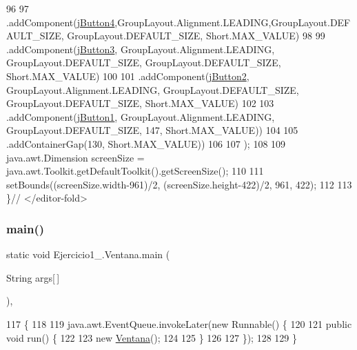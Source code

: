 \begin{DoxyCode}
96 
97                    .addComponent(\mbox{\hyperlink{class_ejercicio1__3_1_1_ventana_a06b0fc7e1c5922e1e6804014d6e3c061}{jButton4}},GroupLayout.Alignment.LEADING,GroupLayout.DEFAULT\_SIZE, 
      GroupLayout.DEFAULT\_SIZE, Short.MAX\_VALUE)
98 
99                    .addComponent(\mbox{\hyperlink{class_ejercicio1__3_1_1_ventana_a41e3718d7909beec7776b977e931a53e}{jButton3}}, GroupLayout.Alignment.LEADING, GroupLayout.DEFAULT\_SIZE,
       GroupLayout.DEFAULT\_SIZE, Short.MAX\_VALUE)
100 
101                    .addComponent(\mbox{\hyperlink{class_ejercicio1__3_1_1_ventana_a53161bde48e247e8ea1ea2bc6474ec97}{jButton2}}, GroupLayout.Alignment.LEADING, GroupLayout.DEFAULT\_SIZE,
       GroupLayout.DEFAULT\_SIZE, Short.MAX\_VALUE)
102 
103                    .addComponent(\mbox{\hyperlink{class_ejercicio1__3_1_1_ventana_a9c2a8cc20df43585485cd2f6f7d54a03}{jButton1}}, GroupLayout.Alignment.LEADING, GroupLayout.DEFAULT\_SIZE,
       147, Short.MAX\_VALUE))
104 
105                 .addContainerGap(130, Short.MAX\_VALUE))
106 
107         );
108 
109         java.awt.Dimension screenSize = java.awt.Toolkit.getDefaultToolkit().getScreenSize();
110 
111         setBounds((screenSize.width-961)/2, (screenSize.height-422)/2, 961, 422);
112 
113     \}\textcolor{comment}{// </editor-fold>}
\end{DoxyCode}
\mbox{\label{class_ejercicio1__3_1_1_ventana_a4024fcfe8931eb8bbdefd2acb995acd8}} 
\subsubsection{\texorpdfstring{main()}{main()}}
{\footnotesize\ttfamily static void Ejercicio1\+\_.\+Ventana.\+main (\begin{DoxyParamCaption}\item[{String}]{args\mbox{[}$\,$\mbox{]} }\end{DoxyParamCaption})\hspace{0.3cm}{\ttfamily [inline]}, {\ttfamily [static]}}


\begin{DoxyCode}
117                                            \{
118 
119         java.awt.EventQueue.invokeLater(\textcolor{keyword}{new} Runnable() \{
120 
121             \textcolor{keyword}{public} \textcolor{keywordtype}{void} run() \{
122 
123                 \textcolor{keyword}{new} \mbox{\hyperlink{class_ejercicio1__3_1_1_ventana_a8b3bdda1602e80bf9c916f202d07eeee}{Ventana}}();
124 
125             \}
126 
127         \});
128 
129     \}
\end{DoxyCode}


